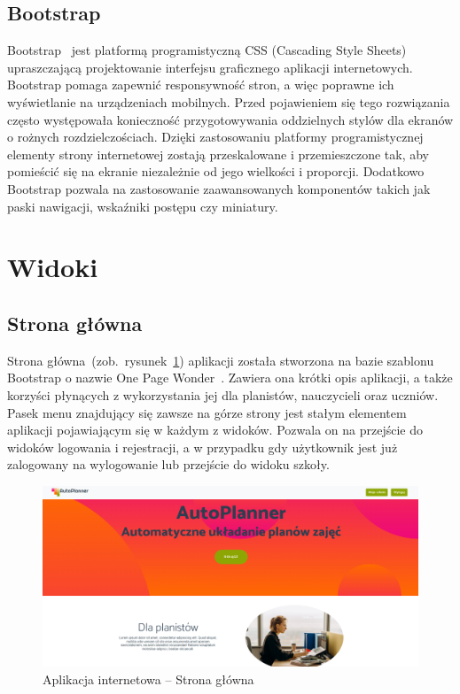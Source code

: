 \subsection{Bootstrap}
Bootstrap~\cite{boot} jest platformą programistyczną CSS (Cascading Style Sheets) upraszczającą projektowanie interfejsu graficznego aplikacji internetowych. Bootstrap pomaga zapewnić responsywność stron, a więc poprawne ich wyświetlanie na urządzeniach mobilnych. Przed pojawieniem się tego rozwiązania często występowała konieczność przygotowywania oddzielnych stylów dla ekranów o rożnych rozdzielczościach. Dzięki zastosowaniu platformy programistycznej elementy strony internetowej zostają przeskalowane i przemieszczone tak, aby pomieścić się na ekranie niezależnie od jego wielkości i proporcji. Dodatkowo Bootstrap pozwala na zastosowanie zaawansowanych komponentów takich jak paski nawigacji, wskaźniki postępu czy miniatury. 

\clearpage
\section{Widoki}
\subsection{Strona główna}
Strona główna~(zob.~rysunek~\ref{rys:main}) aplikacji została stworzona na bazie szablonu Bootstrap o nazwie One Page Wonder~\cite{opw}. Zawiera ona krótki opis aplikacji, a także korzyści płynących z wykorzystania jej dla planistów, nauczycieli oraz uczniów. Pasek menu znajdujący się zawsze na górze strony jest stałym elementem aplikacji pojawiającym się w każdym z widoków. Pozwala on na przejście do widoków logowania i rejestracji, a w przypadku gdy użytkownik jest już zalogowany na wylogowanie lub przejście do widoku szkoły. 
\begin{figure}[!ht]
\centering\includegraphics[width=\textwidth]{figures/main}
\caption{Aplikacja internetowa -- Strona główna}\label{rys:main}
\end{figure}

